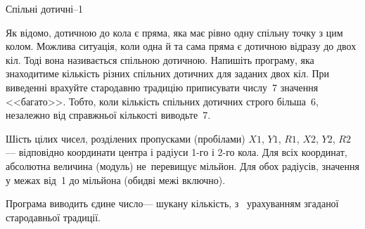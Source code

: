 ﻿\begin{problemAllDefault}{Спільні дотичні--1}

Як відомо, дотичною до кола є пряма, яка має рівно одну спільну точку з цим колом. Можлива ситуація, коли одна й та сама пряма є дотичною  відразу до двох кіл. Тоді вона називається спільною дотичною. Напишіть програму, яка знаходитиме кількість різних спільних дотичних для заданих двох кіл. При виведенні \mbox{врахуйте} стародавню традицію приписувати числу~7 значення <<багато>>. Тобто, коли кількість спільних дотичних строго більша~6, незалежно від справжньої кількості виводьте~7.

\InputFile
Шість цілих чисел, розділених пропусками (пробілами) $X1$, $Y1$, $R1$, $X2$, $Y2$, $R2$\nolinebreak[3] --- відповідно координати центра і радіуси \mbox{1-го} і \mbox{2-го} кола. Для всіх координат, абсолютна величина (модуль) не~перевищує мільйон. Для обох радіусів, значення у межах від~1 до мільйона (обидві межі включно).

\OutputFile
Програма виводить єдине число\nolinebreak[3] --- шукану кількість, з~ урахуванням згаданої стародавньої традиції.

\Example

\begin{example}
%
\end{example}



\end{problemAllDefault}